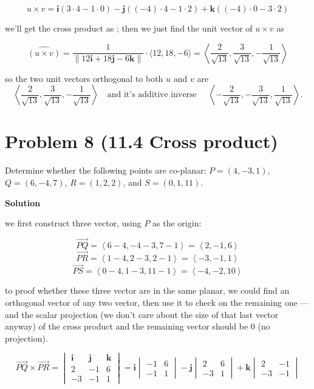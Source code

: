 \documentclass{article}
\newcommand{\solution}{\textbf{\large Solution}}
\theoremstyle{remark}
\begin{document}
\[
    u \times v
    =
    \mathbf{i}(3 \cdot 4 - 1 \cdot 0)
    - \mathbf{j}((-4) \cdot 4 - 1 \cdot 2)
    + \mathbf{k}((-4) \cdot 0 - 3 \cdot 2)
\]

we'll get the cross product as ; then we just find the unit vector of $u \times v$ as 

\[
    \widehat{(u \times v)} = \frac{1}{\left\lVert 12\mathbf{i} + 18\mathbf{j} - 6\mathbf{k} \right\rVert} \cdot \langle 12, 18, -6 \rangle = \left\langle \frac{2}{\sqrt{13}}, \frac{3}{\sqrt{13}}, -\frac{1}{\sqrt{13}} \right\rangle
\]

so the two unit vectors orthogonal to both $u$ and $v$ are
\[
    \boxed{\left\langle \frac{2}{\sqrt{13}}, \frac{3}{\sqrt{13}}, -\frac{1}{\sqrt{13}} \right\rangle}
    \quad \text{and it's additive inverse } \quad
    \boxed{\left\langle -\frac{2}{\sqrt{13}}, -\frac{3}{\sqrt{13}}, \frac{1}{\sqrt{13}} \right\rangle}.
\]



\vspace{1em}
\hrulefill

\section*{Problem 8 (11.4 Cross product)}
Determine whether the following points are co-planar: $P = (4, -3, 1)$, $Q = (6, -4, 7)$, $R = (1, 2, 2)$, and $S = (0, 1, 11)$.

\medskip
\solution

we first construct three vector, using $P$ as the origin:

\[\overrightarrow{PQ} = \left\langle 6 - 4, -4 - 3, 7 - 1 \right\rangle = \left\langle 2, -1, 6 \right\rangle\]
\[\overrightarrow{PR} = \left\langle 1 - 4, 2 - 3, 2 - 1 \right\rangle = \left\langle -3, -1, 1 \right\rangle\]
\[\overrightarrow{PS} = \left\langle 0 - 4, 1 - 3, 11 - 1 \right\rangle = \left\langle -4, -2, 10 \right\rangle\]

to proof whether these three vector are in the same planar, we could find an orthogonal vector of any two vector, then use it to check on the remaining one --- and the scalar projection (we don't care about the size of that last vector anyway) of the cross product and the remaining vector should be 0 (no projection). 

\[
    \overrightarrow{PQ} \times \overrightarrow{PR} =
    \begin{vmatrix}
        \mathbf{i} & \mathbf{j} & \mathbf{k} \\
        2 & -1 & 6 \\
        -3 & -1 & 1
    \end{vmatrix}
    =
    \mathbf{i}\begin{vmatrix}-1 & 6 \\ -1 & 1\end{vmatrix}
    - \mathbf{j}\begin{vmatrix}2 & 6 \\ -3 & 1\end{vmatrix}
    + \mathbf{k}\begin{vmatrix}2 & -1 \\ -3 & -1\end{vmatrix}
\]
\end{document}
